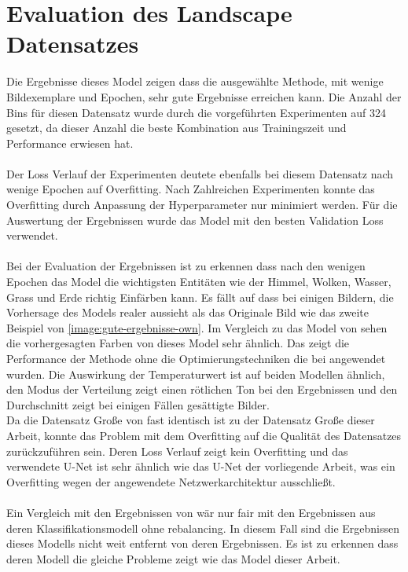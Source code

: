 \section{Evaluation des Landscape Datensatzes}
Die Ergebnisse dieses Model zeigen dass die ausgewählte Methode, mit wenige Bildexemplare und Epochen, sehr gute Ergebnisse erreichen kann.
Die Anzahl der Bins für diesen Datensatz wurde durch die vorgeführten Experimenten auf 324 gesetzt, da dieser Anzahl die beste Kombination
aus Trainingszeit und Performance erwiesen hat.
\\
\\
Der Loss Verlauf der Experimenten deutete ebenfalls bei diesem Datensatz nach wenige Epochen auf Overfitting. Nach Zahlreichen Experimenten
konnte das Overfitting durch Anpassung der Hyperparameter nur minimiert werden. Für die Auswertung der Ergebnissen wurde das Model mit den besten
Validation Loss verwendet.
\\
\\
Bei der Evaluation der Ergebnissen ist zu erkennen dass nach den wenigen Epochen das Model die wichtigsten Entitäten wie der Himmel, Wolken, Wasser,
Grass und Erde richtig Einfärben kann. Es fällt auf dass bei einigen Bildern, die Vorhersage des Models realer aussieht als das Originale Bild
wie das zweite Beispiel von \ref{image:gute-ergebnisse-own}. Im Vergleich zu das Model von \cite{billaut2018colorunet} sehen die vorhergesagten 
Farben von dieses Model sehr ähnlich. Das zeigt die Performance der Methode ohne die Optimierungstechniken die bei \cite{billaut2018colorunet}
angewendet wurden. Die Auswirkung der Temperaturwert ist auf beiden Modellen ähnlich, den Modus der Verteilung zeigt einen rötlichen Ton bei den
Ergebnissen und den Durchschnitt zeigt bei einigen Fällen gesättigte Bilder.
\\
Da die Datensatz Große von \cite{billaut2018colorunet} fast identisch ist zu der Datensatz Große dieser Arbeit, konnte das Problem mit dem Overfitting
auf die Qualität des Datensatzes zurückzuführen sein. Deren Loss Verlauf zeigt kein Overfitting und das verwendete U-Net ist sehr ähnlich wie das
U-Net der vorliegende Arbeit, was ein Overfitting wegen der angewendete Netzwerkarchitektur ausschließt.
\\
\\
Ein Vergleich mit den Ergebnissen von \cite{zhang2016colorful} wär nur fair mit den Ergebnissen aus deren Klassifikationsmodell ohne rebalancing.
In diesem Fall sind die Ergebnissen dieses Modells nicht weit entfernt von deren Ergebnissen. Es ist zu erkennen dass deren Modell die gleiche 
Probleme zeigt wie das Model dieser Arbeit. 



